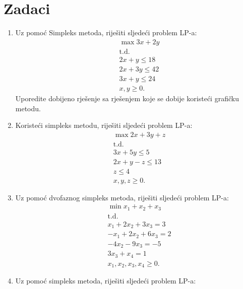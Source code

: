 \documentclass[b5paper, utf8, 11pt, colorlinks]{book}
\theoremstyle{definition}
\begin{document}
\section{Zadaci}
\begin{enumerate}
	\item Uz pomoć Simpleks metoda, riješiti sljedeći problem LP-a:%
	\begin{align*}
		&\max  3x + 2y \\
		& \mbox{t.d.} \\
		& 2x + y \leq 18 \\
		& 2x + 3y \leq 42 \\
		& 3x + y \leq 24 \\
		& x,y \geq 0.
	\end{align*} 
	Uporedite dobijeno rješenje sa rješenjem koje se dobije 
	koristeći grafičku metodu.
	\item %
	Koristeći simpleks metodu, riješiti sljedeći problem LP-a:
	\begin{align*}
		&\max 2x + 3y + z \\
		&   {\mbox{t.d.}} \\
		& 3x + 5 y \leq 5 \\
		& 2x + y - z \leq 13 \\
		& z \leq 4 \\
		& x,y,z \geq 0.
	\end{align*}
	\item Uz pomoć dvofaznog simpleks metoda, riješiti sljedeći problem LP-a:%
	\begin{align*}
		&\min  x_1 + x_2 + x_3 \\
		& {\mbox{t.d.}} \\
		& x_1 + 2 x_2 + 3 x_3 = 3 \\
		& -x_1 + 2 x_2 + 6 x_3 = 2 \\
		& - 4x_2 - 9 x_3 = -5 \\
		& 3 x_3 + x_4 = 1 \\
		& x_1, x_2, x_3, x_4 \geq 0.
	\end{align*}
	\item  Uz pomoć simpleks metoda, riješiti sljedeći problem LP-a:%
	\begin{align*}

\end{align*}
\end{enumerate}
\end{document}
